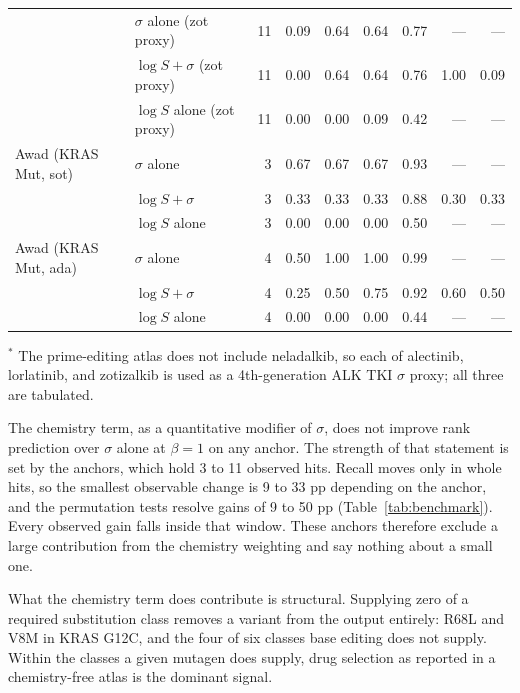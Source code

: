 \documentclass[11pt,a4paper]{article}
\begin{document}
\begin{table}[htbp]
\begin{tabular*}{\textwidth}{@{\extracolsep{\fill}}llrrrrrrr@{}}
                        & $\sigma$ alone (zot proxy)      & 11 & 0.09 & 0.64 & 0.64 & 0.77 & --- & --- \\
                        & $\log S + \sigma$ (zot proxy)   & 11 & 0.00 & 0.64 & 0.64 & 0.76 & 1.00 & 0.09 \\
                        & $\log S$ alone (zot proxy)      & 11 & 0.00 & 0.00 & 0.09 & 0.42 & --- & --- \\
\midrule
Awad (KRAS Mut, sot)    & $\sigma$ alone                  & 3  & 0.67 & 0.67 & 0.67 & 0.93 & --- & --- \\
                        & $\log S + \sigma$               & 3  & 0.33 & 0.33 & 0.33 & 0.88 & 0.30 & 0.33 \\
                        & $\log S$ alone                  & 3  & 0.00 & 0.00 & 0.00 & 0.50 & --- & --- \\
\midrule
Awad (KRAS Mut, ada)    & $\sigma$ alone                  & 4  & 0.50 & 1.00 & 1.00 & 0.99 & --- & --- \\
                        & $\log S + \sigma$               & 4  & 0.25 & 0.50 & 0.75 & 0.92 & 0.60 & 0.50 \\
                        & $\log S$ alone                  & 4  & 0.00 & 0.00 & 0.00 & 0.44 & --- & --- \\
\bottomrule
\end{tabular*}
\vspace{2pt}

\footnotesize $^\ast$ The prime-editing atlas does not include
neladalkib, so each of alectinib, lorlatinib, and zotizalkib is used as
a 4th-generation ALK TKI $\sigma$ proxy; all three are tabulated.
\end{table}

The chemistry term, as a quantitative modifier of $\sigma$, does not
improve rank prediction over $\sigma$ alone at $\beta = 1$ on any
anchor. The strength of that statement is set by the anchors, which
hold 3 to 11 observed hits. Recall moves only in whole hits, so the
smallest observable change is 9 to 33 pp depending on the anchor, and
the permutation tests resolve gains of 9 to 50 pp
(Table~\ref{tab:benchmark}). Every observed gain falls inside that
window. These anchors therefore exclude a large contribution from the
chemistry weighting and say nothing about a small one.

What the chemistry term does contribute is structural. Supplying zero
of a required substitution class removes a variant from the output
entirely: R68L and V8M in KRAS G12C, and the four of six classes base
editing does not supply. Within the classes a given mutagen does
supply, drug selection as reported in a chemistry-free atlas is the
dominant signal.
\end{document}
